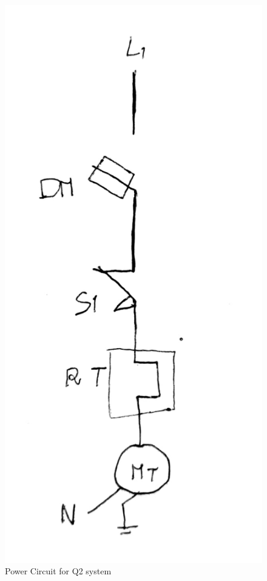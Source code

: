 \begin{figure}[H]
    \includegraphics[width=16cm]{Images/Q2/Q2_power.jpeg}
    \centering
    \caption{Power Circuit for Q2 system}
    \label{fig:Q2_power}
\end{figure}

